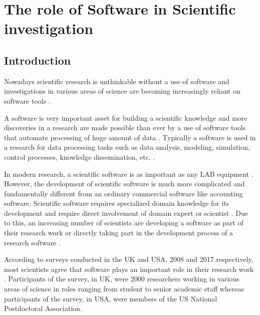 \chapter{The role of Software in Scientific investigation}
\label{ch:Roles}

%

\section{Introduction}
\label{sec:background:intro}

Nowadays scientific research is unthinkable without a use of software and investigations in various areas of science are becoming increasingly reliant on software tools \citep{goble2014better, storer2017bridging, hannay2009scientists, jimenez2017four}.

A software is very important asset for building a scientific knowledge and more discoveries in a research are made possible than ever by a use of software tools that automate processing of huge amount of data \citep{jimenez2017four}. Typically a software is used in a research for data processing tasks such as data analysis, modeling, simulation, control processes, knowledge dissemination, etc. \citep{hannay2009scientists, pan2016disciplinary}. 

In modern research, a scientific software is as important as any LAB equipment \citep{wilson2014best}. However, the development of scientific software is much more complicated and fundamentally different from an ordinary commercial software like accounting software. Scientific software requires specialized domain knowledge for its development and require direct involvement of domain expert or scientist \citep{wilson2014best, segal2008developing}. Due to this, an increasing number of scientists are developing a software as part of their research work or directly taking part in the development process of a research software \citep{jimenez2017four, kanewala2014testing}. 

According to surveys conducted in the UK and USA, 2008 and 2017 respectively, most scientists agree that software plays an important role in their research work \citep{hettrick2014uk, nangia2017track}. Participants of the survey, in UK, were 2000 researchers working in various areas of science in roles ranging from student to senior academic staff whereas participants of the survey, in USA, were members of the US National Postdoctoral Association.
 

